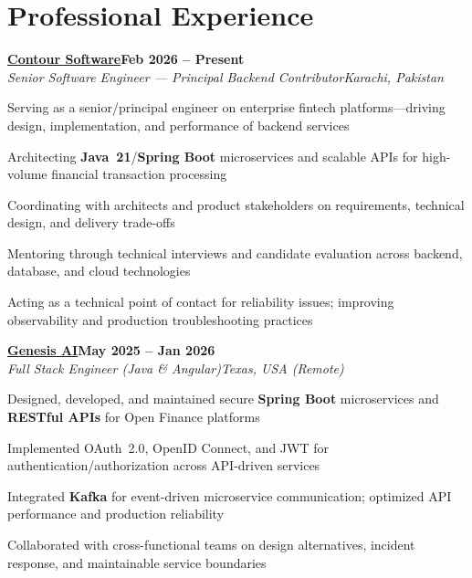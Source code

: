 \documentclass[letterpaper,10pt]{article}
\newcommand{\heading}[2]{
  \hspace{8pt}#1\hfill#2\\
}
\newcommand{\headingBf}[2]{
  \heading{\textbf{#1}}{\textbf{#2}}
}
\newcommand{\headingIt}[2]{
  \heading{\textit{#1}}{\textit{#2}}
}
\newenvironment{resume_list}{
  \vspace{-6pt}
  \begin{itemize}[itemsep=-1px, parsep=0.5pt, topsep=1pt, leftmargin=22pt]
}{
  \end{itemize}
  \vspace{-2pt}
}
\begin{document}
\section{Professional Experience}

\headingBf{\href{https://contour-software.com/}{Contour Software}}{Feb 2026 -- Present}
\headingIt{Senior Software Engineer --- Principal Backend Contributor}{Karachi, Pakistan}
\begin{resume_list}
  \item Serving as a senior/principal engineer on enterprise fintech platforms---driving design, implementation, and performance of backend services
  \item Architecting \textbf{Java~21}/\textbf{Spring Boot} microservices and scalable APIs for high-volume financial transaction processing
  \item Coordinating with architects and product stakeholders on requirements, technical design, and delivery trade-offs
  \item Mentoring through technical interviews and candidate evaluation across backend, database, and cloud technologies
  \item Acting as a technical point of contact for reliability issues; improving observability and production troubleshooting practices
\end{resume_list}

\vspace{2pt}
\headingBf{\href{https://www.linkedin.com/company/genesisaico/}{Genesis AI}}{May 2025 -- Jan 2026}
\headingIt{Full Stack Engineer (Java \& Angular)}{Texas, USA (Remote)}
\begin{resume_list}
  \item Designed, developed, and maintained secure \textbf{Spring Boot} microservices and \textbf{RESTful APIs} for Open Finance platforms
  \item Implemented OAuth~2.0, OpenID Connect, and JWT for authentication/authorization across API-driven services
  \item Integrated \textbf{Kafka} for event-driven microservice communication; optimized API performance and production reliability
  \item Collaborated with cross-functional teams on design alternatives, incident response, and maintainable service boundaries
\end{resume_list}
\end{document}
